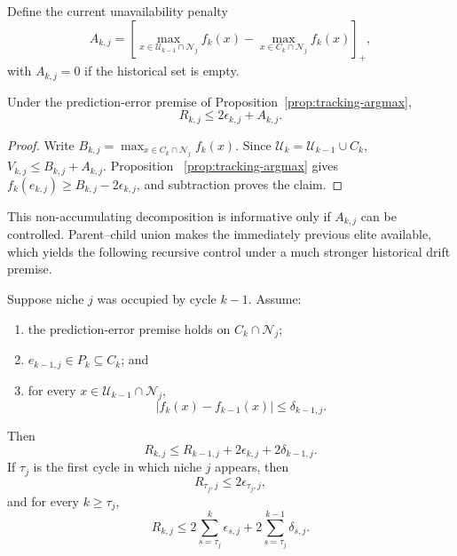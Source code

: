 Define the current unavailability penalty
\[
 A_{k,j}=\left[
 \max_{x\in\mathcal U_{k-1}\cap\mathcal N_j}f_k(x)
 -\max_{x\in C_k\cap\mathcal N_j}f_k(x)
 \right]_+,
\]
with $A_{k,j}=0$ if the historical set is empty.

\begin{proposition}
\label{prop:tracking-decomposition}
Under the prediction-error premise of
Proposition~\ref{prop:tracking-argmax},
\[
 R_{k,j}\leq2\epsilon_{k,j}+A_{k,j}.
\]
\end{proposition}

\begin{proof}
Write $B_{k,j}=\max_{x\in C_k\cap\mathcal N_j}f_k(x)$.  Since
$\mathcal U_k=\mathcal U_{k-1}\cup C_k$,
$V_{k,j}\leq B_{k,j}+A_{k,j}$.  Proposition
~\ref{prop:tracking-argmax} gives
$f_k(e_{k,j})\geq B_{k,j}-2\epsilon_{k,j}$, and subtraction proves the claim.
\end{proof}

This non-accumulating decomposition is informative only if $A_{k,j}$ can be
controlled.  Parent--child union makes the immediately previous elite
available, which yields the following recursive control under a much stronger
historical drift premise.

 

\begin{proposition}
\label{prop:tracking-recurrence}
Suppose niche $j$ was occupied by cycle $k-1$.  Assume:
\begin{enumerate}
\item the prediction-error premise holds on $C_k\cap\mathcal N_j$;
\item $e_{k-1,j}\in P_k\subseteq C_k$; and
\item for every $x\in\mathcal U_{k-1}\cap\mathcal N_j$,
\[
 \lvert f_k(x)-f_{k-1}(x)\rvert\leq\delta_{k-1,j}.
\]
\end{enumerate}
Then
\[
 R_{k,j}\leq R_{k-1,j}
       +2\epsilon_{k,j}+2\delta_{k-1,j}.
\]
If $\tau_j$ is the first cycle in which niche $j$ appears, then
\[
 R_{\tau_j,j}\leq2\epsilon_{\tau_j,j},
\]
and for every $k\geq\tau_j$,
\[
 R_{k,j}\leq
 2\sum_{s=\tau_j}^{k}\epsilon_{s,j}
 +2\sum_{s=\tau_j}^{k-1}\delta_{s,j}.
\]
\end{proposition}

